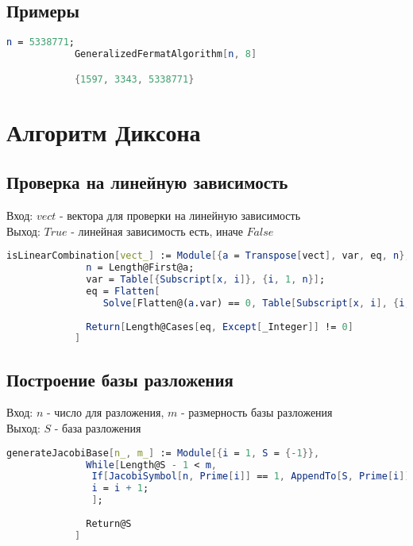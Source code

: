     	\subsection{Примеры}

	    	\begin{lstlisting}[language=Mathematica,caption={
	      		Пример 1
	    	}]
			n = 5338771;
			GeneralizedFermatAlgorithm[n, 8]

			{1597, 3343, 5338771}
	    	\end{lstlisting}

	\section{Алгоритм Диксона}

		\subsection{Проверка на линейную зависимость}
			Вход: $vect$ - вектора для проверки на линейную зависимость \\
			Выход: $True$ - линейная зависимость есть, иначе $False$

			\begin{lstlisting}[language=Mathematica,caption={
	      		Проверка на линейную зависимость
	    	}]
			isLinearCombination[vect_] := Module[{a = Transpose[vect], var, eq, n},
			  n = Length@First@a;
			  var = Table[{Subscript[x, i]}, {i, 1, n}];
			  eq = Flatten[
			     Solve[Flatten@(a.var) == 0, Table[Subscript[x, i], {i, 1, n}]]][[All, 2]];
			  
			  Return[Length@Cases[eq, Except[_Integer]] != 0]
			]
	    	\end{lstlisting}

		\subsection{Построение базы разложения}
			Вход: $n$ - число для разложения, $m$ - размерность базы разложения \\
			Выход: $S$ - база разложения

			\begin{lstlisting}[language=Mathematica,caption={
	      		Построение базы разложения
	    	}]
			generateJacobiBase[n_, m_] := Module[{i = 1, S = {-1}},
			  While[Length@S - 1 < m,
			   If[JacobiSymbol[n, Prime[i]] == 1, AppendTo[S, Prime[i]]];
			   i = i + 1;
			   ];
			  
			  Return@S
			]
	    	\end{lstlisting}

